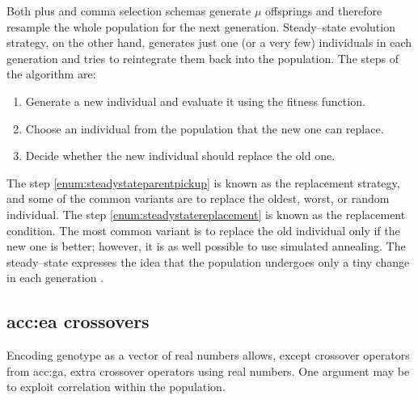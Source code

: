 Both plus and comma selection schemas generate $\mu$ offsprings and therefore resample the whole population for the next generation. Steady--state evolution strategy, on the other hand, generates just one (or a very few) individuals in each generation and tries to reintegrate them back into the population. The steps of the algorithm are:
\begin{enumerate}
    \item Generate a new individual and evaluate it using the fitness function.
    \item\label{enum:steadystateparentpickup} Choose an individual from the population that the new one can replace.
    \item\label{enum:steadystatereplacement} Decide whether the new individual should replace the old one.
\end{enumerate}
The step \ref{enum:steadystateparentpickup} is known as the replacement strategy, and some of the common variants are to replace the oldest, worst, or random individual. The step \ref{enum:steadystatereplacement} is known as the replacement condition. The most common variant is to replace the old individual only if the new one is better; however, it is as well possible to use simulated annealing.
The steady--state expresses the idea that the population undergoes only a tiny change in each generation \citep{SteadyStateEvolutionStrategy}.

\subsection{\texorpdfstring{\acrshort*{acc:ea} crossovers}{Crossovers}}

Encoding genotype as a vector of real numbers allows, except crossover operators from \acrshort{acc:ga}, extra crossover operators using real numbers. One argument may be to exploit correlation within the population.

